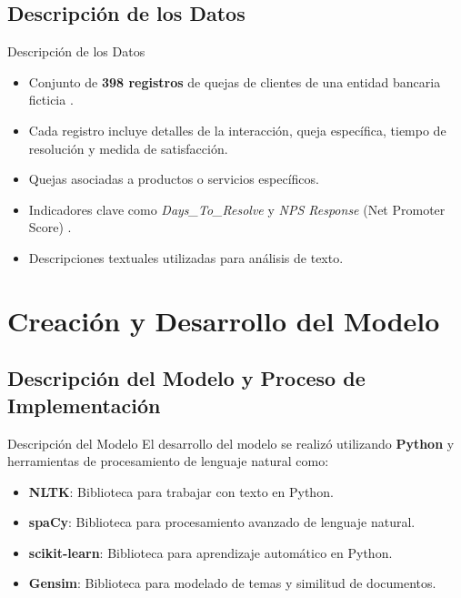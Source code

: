 \documentclass[aspectratio=169, xcolor={dvipsnames}, 10pt, spanish]{beamer}
\begin{document}
\subsection{Descripción de los Datos}
\begin{frame}{Descripción de los Datos}
    \begin{itemize}
        \item Conjunto de \textbf{398 registros} de quejas de clientes de una entidad bancaria ficticia \cite{7}.
        \item Cada registro incluye detalles de la interacción, queja específica, tiempo de resolución y medida de satisfacción.
        \item Quejas asociadas a productos o servicios específicos.
        \item Indicadores clave como \textit{Days\_To\_Resolve} y \textit{NPS Response} (Net Promoter Score) \cite{5}.
        \item Descripciones textuales utilizadas para análisis de texto.
    \end{itemize}
\end{frame}

\section{Creación y Desarrollo del Modelo}
\subsection{Descripción del Modelo y Proceso de Implementación}
\begin{frame}{Descripción del Modelo}
    El desarrollo del modelo se realizó utilizando \textbf{Python} y herramientas de procesamiento de lenguaje natural como:

    \begin{itemize}
        \item \textbf{NLTK}: Biblioteca para trabajar con texto en Python.
        \item \textbf{spaCy}: Biblioteca para procesamiento avanzado de lenguaje natural.
        \item \textbf{scikit-learn}: Biblioteca para aprendizaje automático en Python.
        \item \textbf{Gensim}: Biblioteca para modelado de temas y similitud de documentos.
    \end{itemize}
\end{frame}
\end{document}
